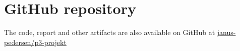 \section{GitHub repository}
The code, report and other artifacts are also available on GitHub at \href{https://github.com/janus-pedersen/p3-projekt}{janus-pedersen/p3-projekt}




